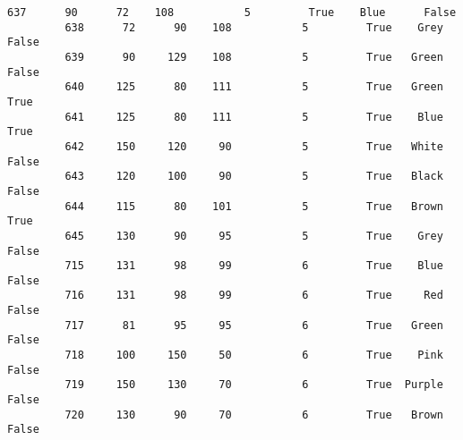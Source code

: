 \documentclass[11pt]{article}
\begin{document}
\begin{Verbatim}[commandchars=\\\{\}]
         637      90      72    108           5         True    Blue      False   
         638      72      90    108           5         True    Grey      False   
         639      90     129    108           5         True   Green      False   
         640     125      80    111           5         True   Green       True   
         641     125      80    111           5         True    Blue       True   
         642     150     120     90           5         True   White      False   
         643     120     100     90           5         True   Black      False   
         644     115      80    101           5         True   Brown       True   
         645     130      90     95           5         True    Grey      False   
         715     131      98     99           6         True    Blue      False   
         716     131      98     99           6         True     Red      False   
         717      81      95     95           6         True   Green      False   
         718     100     150     50           6         True    Pink      False   
         719     150     130     70           6         True  Purple      False   
         720     130      90     70           6         True   Brown      False   
         

\end{Verbatim}
\end{document}
